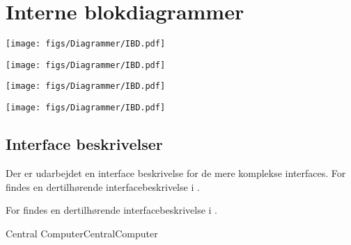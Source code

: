 \section{Interne blokdiagrammer}
\begin{figure*}
	\centering
   	\texttt{[image: figs/Diagrammer/IBD.pdf]}
	\caption{System IBD}
	\label{fig:IBD_System}
\end{figure*}

\begin{figure*}
	\centering
   	\texttt{[image: figs/Diagrammer/IBD.pdf]}
	\caption{IBD for Central Computer, se  for interfacebeskrivelse}
	\label{fig:IBD_CentralComputer}
\end{figure*}
\begin{figure*}
	\centering
   	\texttt{[image: figs/Diagrammer/IBD.pdf]}
	\caption{IBD for Styringsenhed, se  for interfacebeskrivelse}
	\label{fig:IBD_Styringsenhed}
\end{figure*}
\begin{figure*}
	\centering
   	\texttt{[image: figs/Diagrammer/IBD.pdf]}
	\caption{IBD for SumoBot, se  for interfacebeskrivelse}
	\label{fig:IBD_SumoBot}
\end{figure*}

\subsection{Interface beskrivelser}
\noindent Der er udarbejdet en interface beskrivelse for de mere komplekse interfaces. For  findes en dertilhørende interfacebeskrivelse i  .

\noindent For  findes en dertilhørende interfacebeskrivelse i .
\begin{SignalDescription}{Central Computer}{CentralComputer}
\end{SignalDescription}

